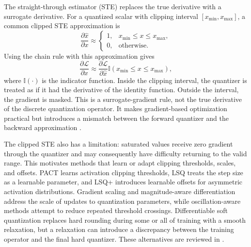 The straight-through estimator (STE) replaces the true derivative
with a surrogate derivative. For a quantized scalar with clipping
interval \([x_{\min},x_{\max}]\), a common clipped STE approximation is
\begin{equation}
    \frac{\partial\widehat{x}}{\partial x}
    \approx
    \begin{cases}
        1, & x_{\min}\leq x\leq x_{\max},\\
        0, & \text{otherwise}.
    \end{cases}
    \label{eq:quant-clipped-ste}
\end{equation}
Using the chain rule with this approximation gives
\begin{equation}
    \frac{\partial\mathcal{L}}{\partial x}
    \approx
    \frac{\partial\mathcal{L}}{\partial\widehat{x}}
    \mathbb{I}(x_{\min}\leq x\leq x_{\max}),
    \label{eq:quant-ste-gradient}
\end{equation}
where \(\mathbb{I}(\cdot)\) is the indicator function. Inside the
clipping interval, the quantizer is treated as if it had the derivative
of the identity function. Outside the interval, the gradient is masked.
This is a surrogate-gradient rule, not the true derivative of the
discrete quantization operator. It makes gradient-based optimization
practical but introduces a mismatch between the forward quantizer and
the backward approximation \parencite{song2026targetcentricqat}.

The clipped STE also has a limitation: saturated values receive zero
gradient through the quantizer and may consequently have difficulty
returning to the valid range. This motivates methods that learn or
adapt clipping thresholds, scales, and offsets. PACT learns activation
clipping thresholds, LSQ treats the step size as a learnable parameter,
and LSQ+ introduces learnable offsets for asymmetric activation
distributions. Gradient scaling and magnitude-aware differentiation
address the scale of updates to quantization parameters, while
oscillation-aware methods attempt to reduce repeated threshold
crossings. Differentiable soft quantization replaces hard rounding
during some or all of training with a smooth relaxation, but a
relaxation can introduce a discrepancy between the training operator
and the final hard quantizer. These alternatives are reviewed in
\textcite{song2026targetcentricqat}.

